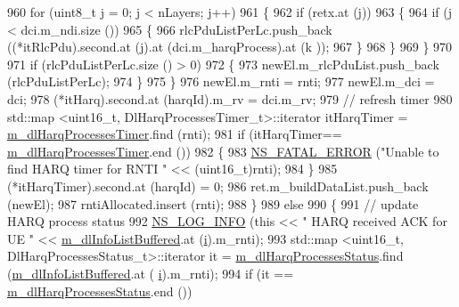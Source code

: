 \begin{DoxyCode}
960               \textcolor{keywordflow}{for} (uint8\_t j = 0; j < nLayers; j++)
961                 \{
962                   \textcolor{keywordflow}{if} (retx.at (j))
963                     \{
964                       \textcolor{keywordflow}{if} (j < dci.m\_ndi.size ())
965                         \{
966                           rlcPduListPerLc.push\_back ((*itRlcPdu).second.at (j).at (dci.m\_harqProcess).at (k
      ));
967                         \}
968                     \}
969                 \}
970 
971               \textcolor{keywordflow}{if} (rlcPduListPerLc.size () > 0)
972                 \{
973                   newEl.m\_rlcPduList.push\_back (rlcPduListPerLc);
974                 \}
975             \}
976           newEl.m\_rnti = rnti;
977           newEl.m\_dci = dci;
978           (*itHarq).second.at (harqId).m\_rv = dci.m\_rv;
979           \textcolor{comment}{// refresh timer}
980           std::map <uint16\_t, DlHarqProcessesTimer\_t>::iterator itHarqTimer = 
      \hyperlink{classns3_1_1TdBetFfMacScheduler_a6421f37924ac8b08b528aec9e7386678}{m\_dlHarqProcessesTimer}.find (rnti);
981           \textcolor{keywordflow}{if} (itHarqTimer== \hyperlink{classns3_1_1TdBetFfMacScheduler_a6421f37924ac8b08b528aec9e7386678}{m\_dlHarqProcessesTimer}.end ())
982             \{
983               \hyperlink{group__fatal_ga5131d5e3f75d7d4cbfd706ac456fdc85}{NS\_FATAL\_ERROR} (\textcolor{stringliteral}{"Unable to find HARQ timer for RNTI "} << (uint16\_t)rnti);
984             \}
985           (*itHarqTimer).second.at (harqId) = 0;
986           ret.m\_buildDataList.push\_back (newEl);
987           rntiAllocated.insert (rnti);
988         \}
989       \textcolor{keywordflow}{else}
990         \{
991           \textcolor{comment}{// update HARQ process status}
992           \hyperlink{group__logging_gafbd73ee2cf9f26b319f49086d8e860fb}{NS\_LOG\_INFO} (\textcolor{keyword}{this} << \textcolor{stringliteral}{" HARQ received ACK for UE "} << 
      \hyperlink{classns3_1_1TdBetFfMacScheduler_ad28a9447cadd7f80c4fe5d3801d8828b}{m\_dlInfoListBuffered}.at (\hyperlink{bernuolliDistribution_8m_a6f6ccfcf58b31cb6412107d9d5281426}{i}).m\_rnti);
993           std::map <uint16\_t, DlHarqProcessesStatus\_t>::iterator it = 
      \hyperlink{classns3_1_1TdBetFfMacScheduler_af9f2ffd80c6d473a5ccee8fb153d40f6}{m\_dlHarqProcessesStatus}.find (\hyperlink{classns3_1_1TdBetFfMacScheduler_ad28a9447cadd7f80c4fe5d3801d8828b}{m\_dlInfoListBuffered}.at (
      \hyperlink{bernuolliDistribution_8m_a6f6ccfcf58b31cb6412107d9d5281426}{i}).m\_rnti);
994           \textcolor{keywordflow}{if} (it == \hyperlink{classns3_1_1TdBetFfMacScheduler_af9f2ffd80c6d473a5ccee8fb153d40f6}{m\_dlHarqProcessesStatus}.end ())

\end{DoxyCode}
